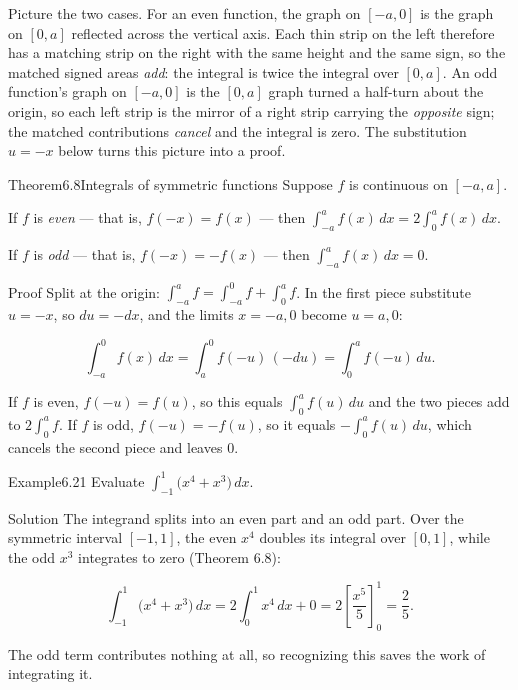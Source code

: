 \documentclass[a4paper,12pt,oneside]{memoir}
\begin{document}
Picture the two cases. For an even function, the graph on \([-a, 0]\) is the graph on \([0, a]\) reflected across the vertical axis. Each thin strip on the left therefore has a matching strip on the right with the same height and the same sign, so the matched signed areas \emph{add}: the integral is twice the integral over \([0, a]\). An odd function’s graph on \([-a, 0]\) is the \([0, a]\) graph turned a half-turn about the origin, so each left strip is the mirror of a right strip carrying the \emph{opposite} sign; the matched contributions \emph{cancel} and the integral is zero. The substitution \(u = -x\) below turns this picture into a proof.

\begin{envtheorem}{Theorem}{6.8}{Integrals of symmetric functions}
Suppose \(f\) is continuous on \([-a, a]\).

\begin{steps}
  \item If \(f\) is \emph{even} — that is, \(f(-x) = f(x)\) — then \(\displaystyle\int_{-a}^{a} f(x)\,dx = 2\int_{0}^{a} f(x)\,dx\).
  \item If \(f\) is \emph{odd} — that is, \(f(-x) = -f(x)\) — then \(\displaystyle\int_{-a}^{a} f(x)\,dx = 0\).
\end{steps}
\end{envtheorem}
\begin{envproof}{Proof}{}{}
Split at the origin: \(\int_{-a}^{a} f = \int_{-a}^{0} f + \int_{0}^{a} f\). In the first piece substitute \(u = -x\), so \(du = -dx\), and the limits \(x = -a, 0\) become \(u = a, 0\):

\[ \int_{-a}^{0} f(x)\,dx = \int_{a}^{0} f(-u)\,(-du) = \int_{0}^{a} f(-u)\,du. \]

If \(f\) is even, \(f(-u) = f(u)\), so this equals \(\int_{0}^{a} f(u)\,du\) and the two pieces add to \(2\int_{0}^{a} f\). If \(f\) is odd, \(f(-u) = -f(u)\), so it equals \(-\int_{0}^{a} f(u)\,du\), which cancels the second piece and leaves \(0\). \qedmark
\end{envproof}
\begin{workedexample}
\begin{envexample}{Example}{6.21}{}
Evaluate \(\displaystyle\int_{-1}^{1} \bigl(x^{4} + x^{3}\bigr)\,dx\).
\end{envexample}
\begin{envsolution}{Solution}{}{}
The integrand splits into an even part and an odd part. Over the symmetric interval \([-1, 1]\), the even \(x^{4}\) doubles its integral over \([0, 1]\), while the odd \(x^{3}\) integrates to zero (Theorem 6.8):

\[ \int_{-1}^{1} \bigl(x^{4} + x^{3}\bigr)\,dx = 2\int_{0}^{1} x^{4}\,dx + 0 = 2\left[\frac{x^{5}}{5}\right]_{0}^{1} = \frac{2}{5}. \]

The odd term contributes nothing at all, so recognizing this saves the work of integrating it. \qedmark
\end{envsolution}
\end{workedexample}
\end{document}
